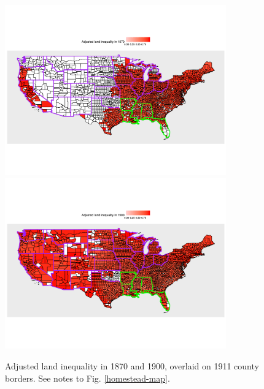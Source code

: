 \documentclass[12pt]{article}
\begin{document}
\begin{figure}[htbp]
	\includegraphics[width=0.85\textwidth]{plots/gini-1870.png} 
	\includegraphics[width=0.85\textwidth]{plots/gini-1900.png} 
	\caption{Adjusted land inequality in 1870 and 1900, overlaid on 1911 county borders. See notes to Fig. \ref{homestead-map}.\label{gini-map}} 
\end{figure}	
\end{document}
